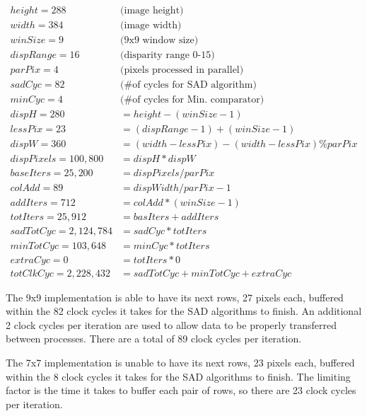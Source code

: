 \begin{subequations}
\begin{align}
	height = 288 	\qquad & \text{(image height)} \label{eq:a}\\
	width = 384 	\qquad & \text{(image width)} \label{eq:b}\\
	winSize = 9	 	\qquad & \text{(9x9 window size)} \label{eq:c}\\
	dispRange = 16 	\qquad & \text{(disparity range 0-15)} \label{eq:d}\\
	parPix = 4 		\qquad & \text{(pixels processed in parallel)} \label{eq:e}\\
	sadCyc = 82		\qquad & \text{(\# of cycles for SAD algorithm)} \label{eq:f}\\
	minCyc = 4		\qquad & \text{(\# of cycles for Min. comparator)} \label{eq:g}\\
	dispH = 280 &= height - (winSize - 1) \label{eq:h}\\
	lessPix = 23 &= (dispRange-1) + (winSize-1) \label{eq:i}\\
	dispW = 360 &= (width-lessPix) - (width-lessPix) \% parPix \label{eq:j}\\
	dispPixels = 100,800 &= dispH * dispW \label{eq:k}\\
	baseIters = 25,200 &= dispPixels / parPix \label{eq:l}\\
	colAdd = 89 &= dispWidth / parPix - 1 \label{eq:m}\\
	addIters = 712 &= colAdd * (winSize-1) \label{eq:n}\\
	totIters = 25,912 &= basIters + addIters \label{eq:o}\\
	sadTotCyc = 2,124,784 &= sadCyc * totIters \label{eq:p}\\
	minTotCyc = 103,648 &= minCyc * totIters \label{eq:q}\\
	extraCyc = 0 &= totIters * 0 \label{eq:r}\\
	totClkCyc = 2,228,432 &= sadTotCyc + minTotCyc + extraCyc \label{eq:s}
\end{align}
	\label{eq:clockCycles}
\end{subequations}

The 9x9 implementation is able to have its next rows, 27 pixels each, buffered within the 82 clock cycles it takes for the SAD algorithms to finish. An additional 2 clock cycles per iteration are used to allow data to be properly transferred between processes. There are a total of 89 clock cycles per iteration.

The 7x7 implementation is unable to have its next rows, 23 pixels each, buffered within the 8 clock cycles it takes for the SAD algorithms to finish. The limiting factor is the time it takes to buffer each pair of rows, so there are 23 clock cycles per iteration.

